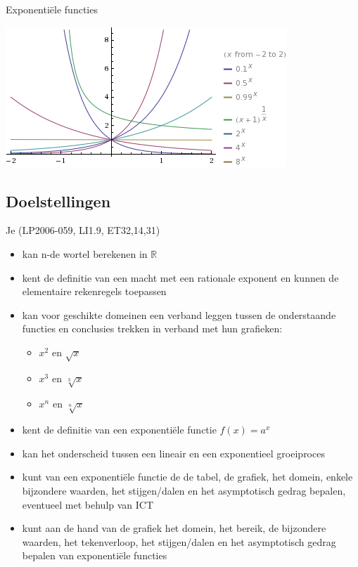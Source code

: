 \documentclass[12pt,twoside]{article}
\begin{document}
\pagestyle{fancy}
\lhead{}

\begin{theorie}

  \thispagestyle{empty}
  \begin{center}
    \begin{mdframed}
      \centering
      \fontsize{40}{60}\selectfont Exponentiële functies
    \end{mdframed}
    \vfill
    \includegraphics{exp_func} %
    \vfill
  \end{center}

  \subsection*{Doelstellingen}
  \vspace*{-0.8cm}
  {\singlespacing
    Je \hfill  {\scriptsize(LP2006-059, LI1.9, ET32,14,31)}
    \begin{itemize}
      \itemsep-0.2em
      \item kan n-de wortel berekenen in $\mathbb{R}$
      \item kent de definitie van een macht met een rationale exponent en kunnen de elementaire rekenregels toepassen
      \item kan voor geschikte domeinen een verband leggen tussen de onderstaande functies en conclusies trekken in verband met hun grafieken:
      \begin{itemize}
        \item $x^2$ en $\sqrt{x}$
        \item $x^3$ en $\sqrt[3]{x}$
        \item $x^n$ en $\sqrt[n]{x}$
      \end{itemize}
      \item kent de definitie van een exponentiële functie $f(x)=a^x$
      \item kan het onderscheid tussen een lineair en een exponentieel groeiproces
      \item kunt van een exponentiële functie de de tabel, de grafiek, het domein, enkele bijzondere waarden, het stijgen/dalen en het asymptotisch gedrag bepalen, eventueel met behulp van ICT
      \item kunt aan de hand van de grafiek het domein, het bereik, de bijzondere waarden, het tekenverloop, het stijgen/dalen en het asymptotisch gedrag bepalen van exponentiële functies
    \end{itemize}}


\end{theorie}
\end{document}
